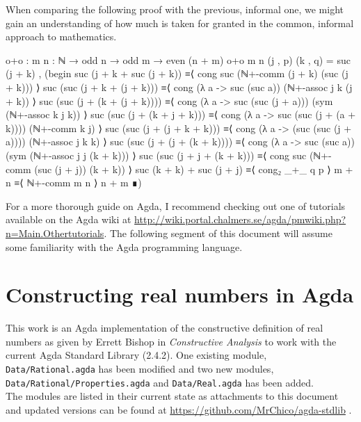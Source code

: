 \documentclass[11pt,a4paper]{article}
\begin{document}
When comparing the following proof with the previous, informal one, we might gain an understanding of how much is taken for granted in the common, informal approach to mathematics. 
\begin{code}
o+o : {m n : ℕ} → odd n → odd m → even (n + m)
o+o {m} {n} (j , p) (k , q) = suc (j + k) , 
  (begin 
    suc (j + k + suc (j + k)) 
≡⟨ cong suc (ℕ+-comm (j + k) (suc (j + k)))  ⟩ 
    suc (suc (j + k + (j + k))) 
≡⟨ cong (λ a -> suc (suc a)) (ℕ+-assoc j k (j + k))  ⟩ 
    suc (suc (j + (k + (j + k)))) 
≡⟨ cong (λ a -> suc (suc (j + a))) (sym (ℕ+-assoc k j k))  ⟩ 
    suc (suc (j + (k + j + k))) 
≡⟨ cong (λ a -> suc (suc (j + (a + k)))) (ℕ+-comm k j)  ⟩
    suc (suc (j + (j + k + k))) 
≡⟨ cong (λ a -> (suc (suc (j + a)))) (ℕ+-assoc j k k)  ⟩ 
    suc (suc (j + (j + (k + k)))) 
≡⟨ cong (λ a -> suc (suc a)) (sym (ℕ+-assoc j j (k + k)))  ⟩ 
    suc (suc (j + j + (k + k))) 
≡⟨ cong suc (ℕ+-comm (suc (j + j)) (k + k)) ⟩ 
    suc (k + k) + suc (j + j) ≡⟨ cong₂ _+_  q p  ⟩ 
    m + n ≡⟨ ℕ+-comm m n  ⟩ 
    n + m
  ∎)
\end{code}
For a more thorough guide on Agda, I recommend checking out one of tutorials available on the Agda wiki at \url{http://wiki.portal.chalmers.se/agda/pmwiki.php?n=Main.Othertutorials}. The following segment of this document will assume some familiarity with the Agda programming language.

\section{Constructing real numbers in Agda}\label{sec: reals in agda}
This work is an Agda implementation of the constructive definition of real numbers as given by Errett Bishop in \textit{Constructive Analysis} \cite{bishop:85} to work with the current Agda Standard Library (2.4.2). One existing module, \texttt{Data/Rational.agda} has been modified and two new modules, \texttt{Data/Rational/Properties.agda} and \texttt{Data/Real.agda} has been added.\\
The modules are listed in their current state as attachments to this document and updated versions can be found at \url{https://github.com/MrChico/agda-stdlib} .\\
\end{document}
